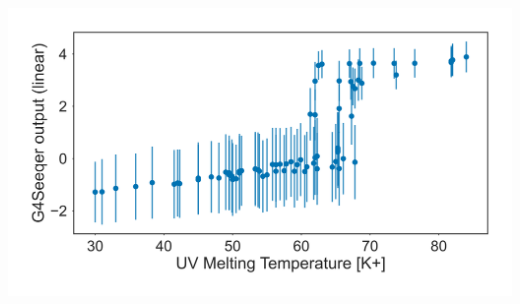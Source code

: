 \documentclass[12pt,a4paper,]{report}
\let\origfigure=\figure
\let\endorigfigure=\endfigure
\renewenvironment{figure}[1][2] {
    \expandafter\origfigure\expandafter[H]
} {
    \endorigfigure
}
\begin{document}
\begin{figure}[htbp]
\centering
\includegraphics[width=\textwidth,height=562pt,keepaspectratio]{chapter_3/figures/tm_vs_score.png}
\caption[G4Seeqer scores correlate with experimentally determined melting temperatures]{\textbf{G4Seeqer   scores   correlate   with   experimentally   determined   melting   temperatures}   Scatter   plot   showing   median   G4Seeqer   scores   vs. UV   melting   temperature   for   sequences   from   Guédin   et   al. 2010.   Error   bars   are   68\%   confidence   intervals   generated   from   1000   iterations   of   prediction   with   randomly   generated   flanking   sequences.   \label{tm}}
\end{figure}

\newpage
\end{document}
